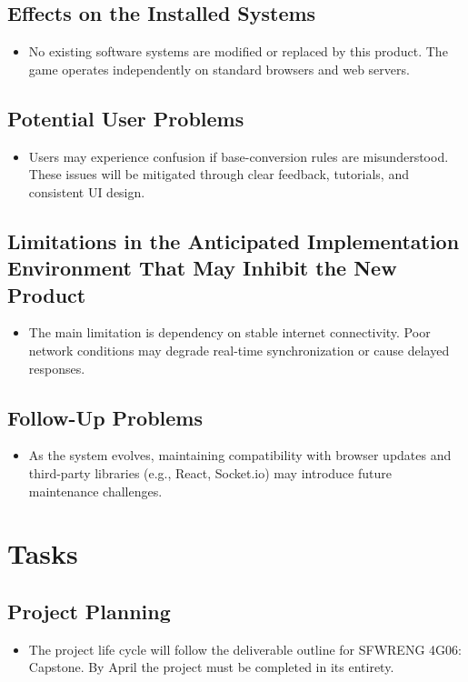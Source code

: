 \documentclass[12pt]{article}
\begin{document}
\subsection{Effects on the Installed Systems}
\begin{itemize}
	\item No existing software systems are modified or replaced by this product. The game operates independently on standard browsers and web servers.
\end{itemize}
\subsection{Potential User Problems}
\begin{itemize}
	\item Users may experience confusion if base-conversion rules are misunderstood. These issues will be mitigated through clear feedback, tutorials, and consistent UI design.
\end{itemize}
\subsection{Limitations in the Anticipated Implementation Environment That May
Inhibit the New Product}
\begin{itemize}
	\item The main limitation is dependency on stable internet connectivity. Poor network conditions may degrade real-time synchronization or cause delayed responses.
\end{itemize}
\subsection{Follow-Up Problems}
\begin{itemize}
	\item As the system evolves, maintaining compatibility with browser updates and third-party libraries (e.g., React, Socket.io) may introduce future maintenance challenges.
\end{itemize}
\section{Tasks}
\subsection{Project Planning}
\begin{itemize}
	\item The project life cycle will follow the deliverable outline for SFWRENG 4G06: Capstone. By April the project must be completed in its entirety.
\end{itemize}
\end{document}
